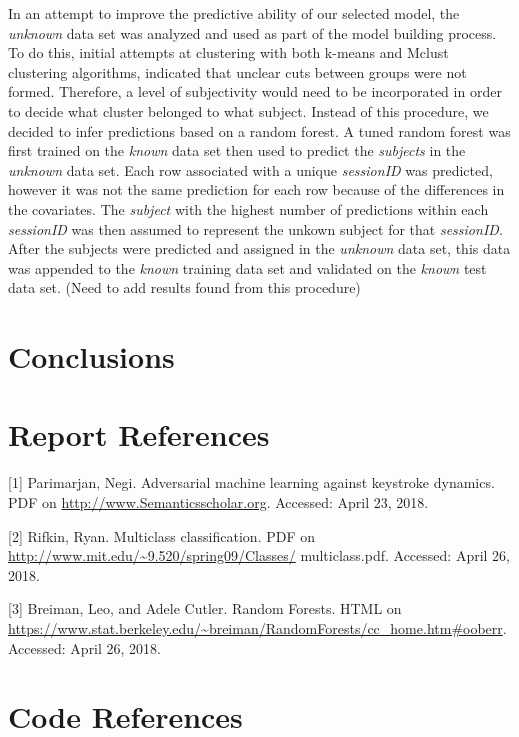 \documentclass[]{article}
\begin{document}
In an attempt to improve the predictive ability of our selected model,
the \emph{unknown} data set was analyzed and used as part of the model
building process. To do this, initial attempts at clustering with both
k-means and Mclust clustering algorithms, indicated that unclear cuts
between groups were not formed. Therefore, a level of subjectivity would
need to be incorporated in order to decide what cluster belonged to what
subject. Instead of this procedure, we decided to infer predictions
based on a random forest. A tuned random forest was first trained on the
\emph{known} data set then used to predict the \emph{subjects} in the
\emph{unknown} data set. Each row associated with a unique
\emph{sessionID} was predicted, however it was not the same prediction
for each row because of the differences in the covariates. The
\emph{subject} with the highest number of predictions within each
\emph{sessionID} was then assumed to represent the unkown subject for
that \emph{sessionID}. After the subjects were predicted and assigned in
the \emph{unknown} data set, this data was appended to the \emph{known}
training data set and validated on the \emph{known} test data set. (Need
to add results found from this procedure)

\section{Conclusions}\label{conclusions}

\section{Report References}\label{report-references}

{[}1{]} Parimarjan, Negi. Adversarial machine learning against keystroke
dynamics. PDF on \url{http://www.Semanticsscholar.org}. Accessed: April
23, 2018.

{[}2{]} Rifkin, Ryan. Multiclass classification. PDF on
\url{http://www.mit.edu/~9.520/spring09/Classes/} multiclass.pdf.
Accessed: April 26, 2018.

{[}3{]} Breiman, Leo, and Adele Cutler. Random Forests. HTML on
\url{https://www.stat.berkeley.edu/~breiman/RandomForests/cc_home.htm\#ooberr}.
Accessed: April 26, 2018.

\section{Code References}\label{code-references}
\end{document}
